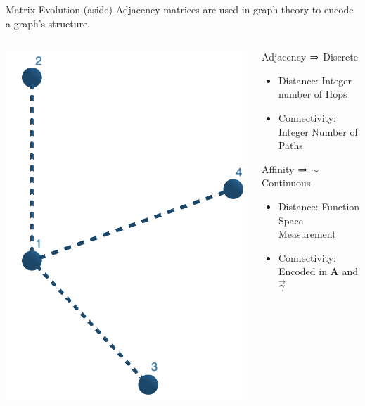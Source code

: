 \begin{frame}{Matrix Evolution \tiny{(aside)}}
    Adjacency matrices are used in graph theory to encode a graph's structure.
    \begin{columns}
        \begin{column}{.3\textwidth}
            \includegraphics[width=.8\textwidth, clip=True, trim= 0in .05in 0in 0in]{../Images/my_graph.png}
        \end{column}        
        \begin{column}{.7\textwidth}
            Adjacency $\Rightarrow$ Discrete
            \begin{itemize}
                \item Distance: Integer number of Hops
                \item Connectivity: Integer Number of Paths
            \end{itemize}
            Affinity $\Rightarrow$ $\sim$Continuous 
            \begin{itemize}
                \item Distance: Function Space Measurement 
                \item Connectivity: Encoded in $\mathbf{A}$ and ${\vec{\gamma}}$

\end{itemize}
\end{column}
\end{columns}
\end{frame}
